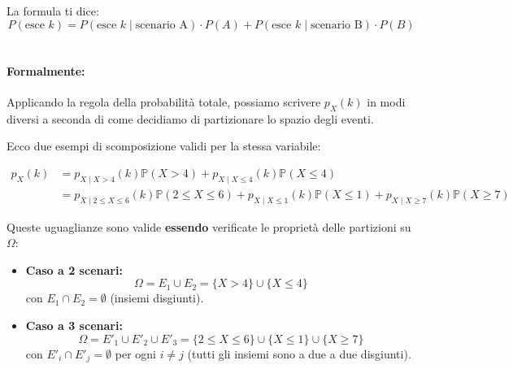 La formula ti dice:
\[
P(\text{esce } k) = P(\text{esce } k \mid \text{scenario A}) \cdot P(A) + P(\text{esce } k \mid \text{scenario B}) \cdot P(B)
\]
\\
\paragraph{Formalmente:} Applicando la regola della probabilità totale, possiamo scrivere $p_X(k)$ in modi diversi a seconda di come decidiamo di partizionare lo spazio degli eventi.

Ecco due esempi di scomposizione validi per la stessa variabile:

\begin{align*}
p_X(k) &= p_{X \mid X>4}(k)\mathbb{P}(X > 4) + p_{X \mid X \le 4}(k)\mathbb{P}(X \le 4) \\[1em]
&= p_{X \mid 2 \le X \le 6}(k)\mathbb{P}(2 \le X \le 6) + p_{X \mid X \le 1}(k)\mathbb{P}(X \le 1) + p_{X \mid X \ge 7}(k)\mathbb{P}(X \ge 7)
\end{align*}

Queste uguaglianze sono valide \textbf{essendo} verificate le proprietà delle partizioni su $\Omega$:

\begin{itemize}
    \item \textbf{Caso a 2 scenari:}
    \[ \Omega = E_1 \cup E_2 = \{X > 4\} \cup \{X \le 4\} \]
    con $E_1 \cap E_2 = \emptyset$ (insiemi disgiunti).
    
    \item \textbf{Caso a 3 scenari:}
    \[ \Omega = E'_1 \cup E'_2 \cup E'_3 = \{2 \le X \le 6\} \cup \{X \le 1\} \cup \{X \ge 7\} \]
    con $E'_i \cap E'_j = \emptyset$ per ogni $i \neq j$ (tutti gli insiemi sono a due a due disgiunti).
\end{itemize}

